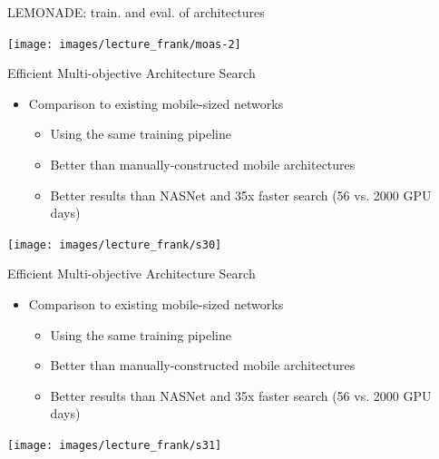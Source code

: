 \begin{frame}[c]{LEMONADE: train. and eval. of architectures}

{\centering \hspace*{1.25cm}
	\texttt{[image: images/lecture\_frank/moas-2]}
}
\end{frame}
{
\begin{frame}[c]{Efficient Multi-objective Architecture Search}
\begin{itemize}
	\item \alert{Comparison to existing mobile-sized networks}
	\begin{itemize}
		\item Using the same training pipeline
		\item Better than manually-constructed mobile architectures
		\item Better results than NASNet and 35x faster search (56 vs. 2000 GPU days)
	\end{itemize}
\end{itemize}
{\centering
\texttt{[image: images/lecture\_frank/s30]}
}
\end{frame}
}
{
\begin{frame}[c]{Efficient Multi-objective Architecture Search}
\begin{itemize}
	\item \alert{Comparison to existing mobile-sized networks}
	\begin{itemize}
		\item Using the same training pipeline
		\item Better than manually-constructed mobile architectures
		\item Better results than NASNet and 35x faster search (56 vs. 2000 GPU days)
	\end{itemize}
\end{itemize}
{\centering
	\texttt{[image: images/lecture\_frank/s31]}
}
\end{frame}
}
